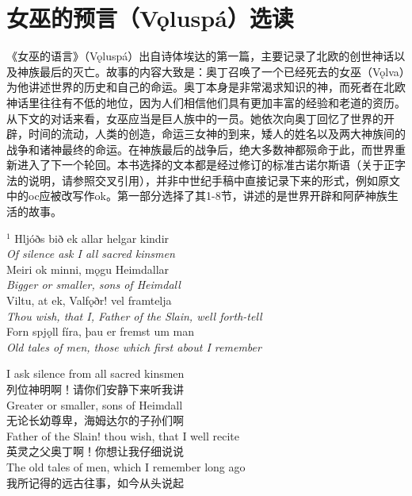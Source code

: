 \section{女巫的预言（Vǫluspá）选读}
《女巫的语言》（Vǫluspá）出自诗体埃达的第一篇，主要记录了北欧的创世神话以及神族最后的灭亡。故事的内容大致是：奥丁召唤了一个已经死去的女巫（Vǫlva）为他讲述世界的历史和自己的命运。奥丁本身是非常渴求知识的神，而死者在北欧神话里往往有不低的地位，因为人们相信他们具有更加丰富的经验和老道的资历。从下文的对话来看，女巫应当是巨人族中的一员。她依次向奥丁回忆了世界的开辟，时间的流动，人类的创造，命运三女神的到来，矮人的姓名以及两大神族间的战争和诸神最终的命运。在神族最后的战争后，绝大多数神都殒命于此，而世界重新进入了下一个轮回。本书选择的文本都是经过修订的标准古诺尔斯语（关于正字法的说明，请参照交叉引用），并非中世纪手稿中直接记录下来的形式，例如原文中的oc应被改写作ok。第一部分选择了其1-8节，讲述的是世界开辟和阿萨神族生活的故事。
\hspace*{\fill}\\ %
\begin{paracol}{2}
    \noindent
    $^1 $ Hljóðs bið ek allar helgar kindir\\
    \textit{Of silence ask I all sacred kinsmen}\\
    Meiri ok minni, mǫgu Heimdallar\footnotemark\\
    \textit{Bigger or smaller, sons of Heimdall}\\
    Viltu, at ek, Valfǫðr\footnotemark! vel framtelja\\
    \textit{Thou wish, that I, Father of the Slain, well forth-tell}\\
    Forn spjǫll fíra, þau er fremst um man\\
    \textit{Old tales of men, those which first about I remember}\\
    \switchcolumn

    \noindent
    I ask silence from all sacred kinsmen\\
    列位神明啊！请你们安静下来听我讲\\
    Greater or smaller, sons of Heimdall\\
    无论长幼尊卑，海姆达尔的子孙们啊\\
    Father of the Slain! thou wish, that I well recite\\
    英灵之父奥丁啊！你想让我仔细说说\\
    The old tales of men, which I remember long ago\\
    我所记得的远古往事，如今从头说起\\
\end{paracol}
